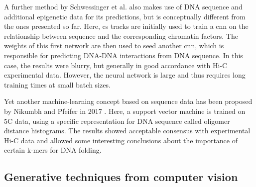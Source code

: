 A further method by Schwessinger et al. \cite{Schwessinger2019} also makes use of DNA sequence and additional epigenetic data for its predictions,
but is conceptually different from the ones presented so far.
Here, \acrshort{cs} tracks are initially used to train a \acrshort{cnn} on the relationship between sequence and 
the corresponding chromatin factors. The weights of this first network are then used to seed another \acrlong{cnn},
which is responsible for predicting DNA-DNA interactions from DNA sequence.
In this case, the results were blurry, but generally in good accordance with Hi-C experimental data.
However, the neural network is large and thus requires long training times at small batch sizes.

Yet another machine-learning concept based on sequence data has been proposed by Nikumbh and Pfeifer in 2017 \cite{Nikumbh2017}.
Here, a support vector machine is trained on 5C data, using a specific representation for DNA sequence called oligomer distance histograms.
The results showed acceptable consensus with experimental Hi-C data and allowed some interesting conclusions
about the importance of certain k-mers for DNA folding.


\subsection{Generative techniques from computer vision} \label{sec:prior:generativeCV}
